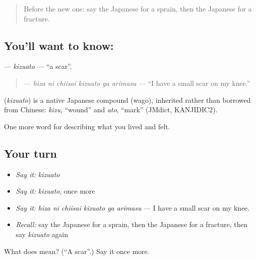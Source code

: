 \begin{quote}
Before the new one: say the Japanese for a sprain, then the Japanese for a fracture.
\end{quote}

\subsection*{You'll want to know: }
\textbf{} — \emph{kizuato} — \textquotedblleft{}a scar\textquotedblright{}.

\begin{quote}
\textbf{   } — \emph{hiza ni chiisai kizuato ga arimasu} — \textquotedblleft{}I have a small scar on my knee.\textquotedblright{}
\end{quote}

\begin{cousinweb}
\textbf{} (\emph{kizuato}) is a native Japanese compound (wago), inherited rather than borrowed from Chinese: \emph{kizu}, \textquotedblleft{}wound\textquotedblright{} and \emph{ato}, \textquotedblleft{}mark\textquotedblright{} (JMdict, KANJIDIC2).
\end{cousinweb}

\begin{grammarlens}[title={What you've built}]
One more word for describing what you lived and felt.
\end{grammarlens}

\subsection*{Your turn}
\begin{itemize}
\raggedright
  \item \emph{Say it:} \emph{kizuato}
  \item \emph{Say it:} \emph{kizuato}, once more
  \item \emph{Say it:} \emph{hiza ni chiisai kizuato ga arimasu} — I have a small scar on my knee.
  \item \emph{Recall:} say the Japanese for a sprain, then the Japanese for a fracture, then say \emph{kizuato} again
\end{itemize}

\begin{tcolorbox}[breakable,colback=teal!4,colframe=teal!35!black,title={Before you move on}]
What does  mean? (\textquotedblleft{}A scar\textquotedblright{}.) Say it once more.
\end{tcolorbox}
